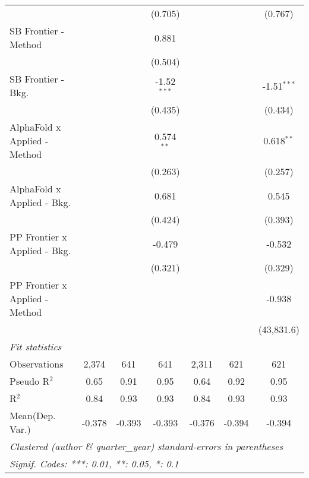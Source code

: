 \begin{tabular}{lcccccc}
                                  &               &              & (0.705)       &                &               & (0.767)\\   
   SB Frontier - Method           &               &              & 0.881         &                &               &   \\   
                                  &               &              & (0.504)       &                &               &   \\   
   SB Frontier - Bkg.             &               &              & -1.52$^{***}$ &                &               & -1.51$^{***}$\\   
                                  &               &              & (0.435)       &                &               & (0.434)\\   
   AlphaFold x Applied - Method   &               &              & 0.574$^{**}$  &                &               & 0.618$^{**}$\\   
                                  &               &              & (0.263)       &                &               & (0.257)\\   
   AlphaFold x Applied - Bkg.     &               &              & 0.681         &                &               & 0.545\\   
                                  &               &              & (0.424)       &                &               & (0.393)\\   
   PP Frontier x Applied - Bkg.   &               &              & -0.479        &                &               & -0.532\\   
                                  &               &              & (0.321)       &                &               & (0.329)\\   
   PP Frontier x Applied - Method &               &              &               &                &               & -0.938\\   
                                  &               &              &               &                &               & (43,831.6)\\   
   \midrule
   \emph{Fit statistics}\\
   Observations                   & 2,374         & 641          & 641           & 2,311          & 621           & 621\\  
   Pseudo R$^2$                   & 0.65          & 0.91         & 0.95          & 0.64           & 0.92          & 0.95\\  
   R$^2$                          & 0.84          & 0.93         & 0.93          & 0.84           & 0.93          & 0.93\\  
Mean(Dep. Var.) & -0.378 & -0.393 & -0.393 & -0.376 & -0.394 & -0.394 \\
   \midrule \midrule
   \multicolumn{7}{l}{\emph{Clustered (author \& quarter\_year) standard-errors in parentheses}}\\
   \multicolumn{7}{l}{\emph{Signif. Codes: ***: 0.01, **: 0.05, *: 0.1}}\\
\end{tabular}
\par\endgroup
